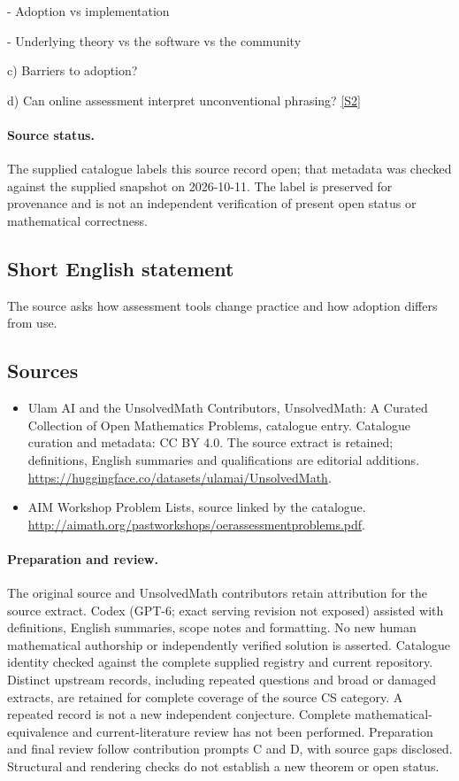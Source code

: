 \documentclass[11pt]{article}
\newcommand{\sref}[2]{\hyperlink{source:#1:#2}{[S#2]}}
\begin{document}
- Adoption vs implementation

- Underlying theory vs the software vs the community

c) Barriers to adoption?

d) Can online assessment interpret unconventional phrasing? \sref{statement}{2}
\paragraph{Source status.}
The supplied catalogue labels this source record open; that metadata was checked against the supplied snapshot on 2026-10-11. The label is preserved for provenance and is not an independent verification of present open status or mathematical correctness.
\subsection{Short English statement}
The source asks how assessment tools change practice and how adoption differs from use.
\subsection{Sources}
\begin{itemize}
\item[\hypertarget{source:statement:1}{S1}] Ulam AI and the UnsolvedMath Contributors, UnsolvedMath: A Curated Collection of Open Mathematics Problems, catalogue entry. Catalogue curation and metadata: CC BY 4.0. The source extract is retained; definitions, English summaries and qualifications are editorial additions.
\url{https://huggingface.co/datasets/ulamai/UnsolvedMath}.
\item[\hypertarget{source:statement:2}{S2}] AIM Workshop Problem Lists, source linked by the catalogue.
\url{http://aimath.org/pastworkshops/oerassessmentproblems.pdf}.
\end{itemize}
\paragraph{Preparation and review.}
The original source and UnsolvedMath contributors retain attribution for the source extract. Codex (GPT-6; exact serving revision not exposed) assisted with definitions, English summaries, scope notes and formatting. No new human mathematical authorship or independently verified solution is asserted. Catalogue identity checked against the complete supplied registry and current repository. Distinct upstream records, including repeated questions and broad or damaged extracts, are retained for complete coverage of the source CS category. A repeated record is not a new independent conjecture. Complete mathematical-equivalence and current-literature review has not been performed. Preparation and final review follow contribution prompts C and D, with source gaps disclosed. Structural and rendering checks do not establish a new theorem or open status.
\label{end:statement}
\end{document}
